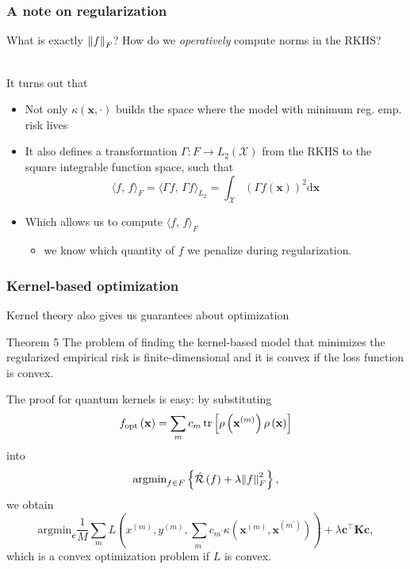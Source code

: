 \documentclass[aspectratio=43]{beamer}
\newcommand{\inner}[2]{\langle #1,\, #2\rangle}
\newcommand{\kernel}[2]{\kappa\left( #1, #2 \right)}
\begin{document}
\begin{frame}
  \frametitle{A note on regularization}

  What is exactly $\norm{f}_F$? How do we \emph{operatively} compute norms in the RKHS?

  \ \\
  \pause
  It turns out that
  \begin{itemize}
    \item<2-> Not only $\kernel{\mathbf{x}}{\cdot}$ builds the space where the model with minimum reg. emp. risk lives
    \item<2-> It also defines a transformation $\Gamma:F\rightarrow L_2(\mathcal{X})$ from the RKHS to the square integrable function space, such that
    \[\inner{f}{f}_F=\inner{\Gamma f}{\Gamma f}_{L_2} = \int_\mathcal{X} \left( \Gamma f(\mathbf{x})  \right)^2 \mathrm{d}\mathbf{x}\]
    \item<3-> Which allows us to compute $\inner{f}{f}_F$
    \begin{itemize}
      \item we know which quantity of $f$ we penalize during regularization.
    \end{itemize} 
  \end{itemize}

\end{frame}


\begin{frame}
  \frametitle{Kernel-based optimization}

  Kernel theory also gives us guarantees about optimization

  \pause
  \begin{block}{Theorem 5}
    The problem of finding the kernel-based model that minimizes the regularized empirical risk is finite-dimensional and it is convex if the loss function is convex.
  \end{block}

  \pause
  \footnotesize
  The proof for quantum kernels is easy: by substituting 
  \[f_{\mathrm{opt}}\left( \mathbf{x} \right) = \sum_m c_m \tr\left[ \rho\left( \mathbf{x}^{(m)} \right) \rho\left( \mathbf{x} \right)\right]\]
  into
  \[\mathrm{argmin}_{f\in F}\left\{ \hat{\mathcal{R}}\left( f \right) + \lambda \norm{f}^2_F \right\},\]
  we obtain
  \[\mathrm{argmin}_\mathbf{c} \frac{1}{M}\sum_m L\left( x^{(m)}, y^{(m)}, \sum_{m^\prime} c_{m^\prime} \kernel{\mathbf{x}^{(m)}}{\mathbf{x}^{(m^\prime)}} \right) + \lambda \mathbf{c}^\top \mathbf{K} \mathbf{c},\]
  which is a convex optimization problem if $L$ is convex.

\end{frame}
\end{document}
